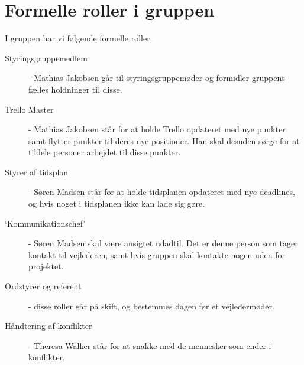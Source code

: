 \documentclass[hidelinks, 12pt]{article}
\begin{document}
	\section*{Formelle roller i gruppen}
	I gruppen har vi følgende formelle roller:
	\begin{description}
		\item[Styringsgruppemedlem] - Mathias Jakobsen går til styringsgruppemøder og formidler gruppens fælles holdninger til disse.
		\item[Trello Master] - Mathias Jakobsen står for at holde Trello opdateret med nye punkter samt flytter punkter til deres nye positioner. Han skal desuden sørge for at tildele personer arbejdet til disse punkter.
		\item[Styrer af tidsplan] - Søren Madsen står for at holde tidsplanen opdateret med nye deadlines, og hvis noget i tidsplanen ikke kan lade sig gøre.
		\item[`Kommunikationschef'] - Søren Madsen skal være ansigtet udadtil. Det er denne person som tager kontakt til vejlederen, samt hvis gruppen skal kontakte nogen uden for projektet.
		\item[Ordstyrer og referent] - disse roller går på skift, og bestemmes dagen før et vejledermøder.
		\item[Håndtering af konflikter] - Theresa Walker står for at snakke med de mennesker som ender i konflikter. 
	\end{description}
\end{document}
